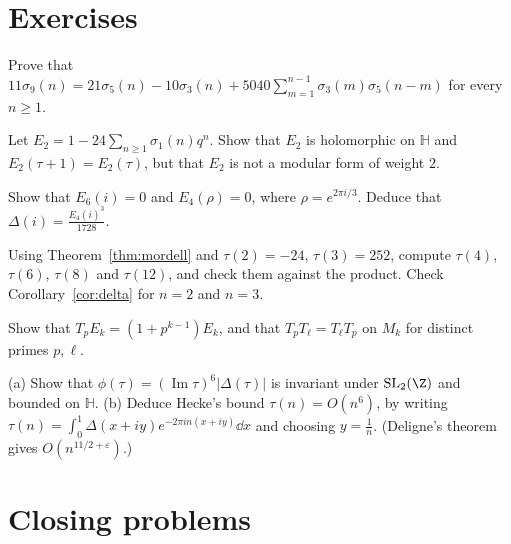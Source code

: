 \section{Exercises}

\begin{exercise}[$\star$]\label{ex:sigma9}
Prove that $11\sigma_9(n)=21\sigma_5(n)-10\sigma_3(n)+5040\sum_{m=1}^{n-1}\sigma_3(m)\sigma_5(n-m)$ for every $n\ge1$.
\end{exercise}

\begin{exercise}[$\star$]\label{ex:e2}
Let $E_2=1-24\sum_{n\ge1}\sigma_1(n)q^n$. Show that $E_2$ is holomorphic on $\mathbb H$ and $E_2(\tau+1)=E_2(\tau)$, but that $E_2$ is not a modular form of weight $2$.
\end{exercise}

\begin{exercise}[$\star$]\label{ex:zeros}
Show that $E_6(i)=0$ and $E_4(\rho)=0$, where $\rho=e^{2\pi i/3}$. Deduce that $\Delta(i)=\frac{E_4(i)^3}{1728}$.
\end{exercise}

\begin{exercise}[$\star$]\label{ex:tausmall}
Using Theorem~\ref{thm:mordell} and $\tau(2)=-24$, $\tau(3)=252$, compute $\tau(4)$, $\tau(6)$, $\tau(8)$ and $\tau(12)$, and check them against the product. Check Corollary~\ref{cor:delta} for $n=2$ and $n=3$.
\end{exercise}

\begin{exercise}[$\star\star$]\label{ex:eisensteinhecke}
Show that $T_pE_k=(1+p^{k-1})E_k$, and that $T_pT_\ell=T_\ell T_p$ on $M_k$ for distinct primes $p,\ell$.
\end{exercise}

\begin{exercise}\label{ex:heckebound}
(a) Show that $\phi(\tau)=(\operatorname{Im}\tau)^6|\Delta(\tau)|$ is invariant under $\mathrm{SL}_2(\Z)$ and bounded on $\mathbb H$.
(b) Deduce Hecke's bound $\tau(n)=O(n^6)$, by writing $\tau(n)=\int_0^1\Delta(x+iy)e^{-2\pi in(x+iy)}\dd x$ and choosing $y=\frac1n$. (Deligne's theorem gives $O(n^{11/2+\varepsilon})$.)
\end{exercise}

\section{Closing problems}

